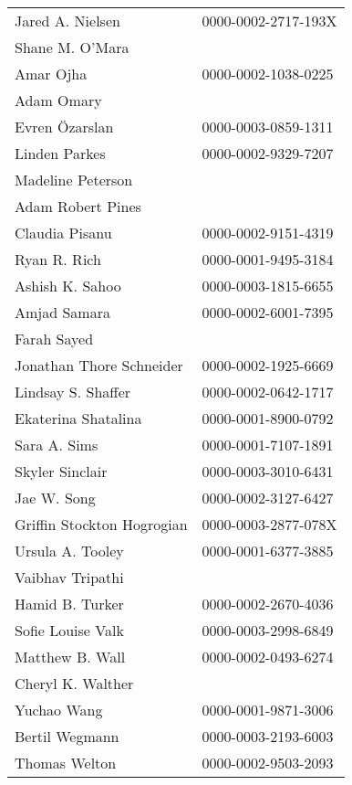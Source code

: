 \begin{longtable}{ll}
          Jared A. Nielsen & 0000-0002-2717-193X \\
           Shane M. O'Mara &                     \\
                 Amar Ojha & 0000-0002-1038-0225 \\
                Adam Omary &                     \\
            Evren Özarslan & 0000-0003-0859-1311 \\
             Linden Parkes & 0000-0002-9329-7207 \\
         Madeline Peterson &                     \\
         Adam Robert Pines &                     \\
            Claudia Pisanu & 0000-0002-9151-4319 \\
              Ryan R. Rich & 0000-0001-9495-3184 \\
           Ashish K. Sahoo & 0000-0003-1815-6655 \\
              Amjad Samara & 0000-0002-6001-7395 \\
               Farah Sayed &                     \\
  Jonathan Thore Schneider & 0000-0002-1925-6669 \\
        Lindsay S. Shaffer & 0000-0002-0642-1717 \\
       Ekaterina Shatalina & 0000-0001-8900-0792 \\
              Sara A. Sims & 0000-0001-7107-1891 \\
           Skyler Sinclair & 0000-0003-3010-6431 \\
               Jae W. Song & 0000-0002-3127-6427 \\
Griffin Stockton Hogrogian & 0000-0003-2877-078X \\
          Ursula A. Tooley & 0000-0001-6377-3885 \\
          Vaibhav Tripathi &                     \\
           Hamid B. Turker & 0000-0002-2670-4036 \\
         Sofie Louise Valk & 0000-0003-2998-6849 \\
           Matthew B. Wall & 0000-0002-0493-6274 \\
         Cheryl K. Walther &                     \\
               Yuchao Wang & 0000-0001-9871-3006 \\
            Bertil Wegmann & 0000-0003-2193-6003 \\
             Thomas Welton & 0000-0002-9503-2093 \\

\end{longtable}
